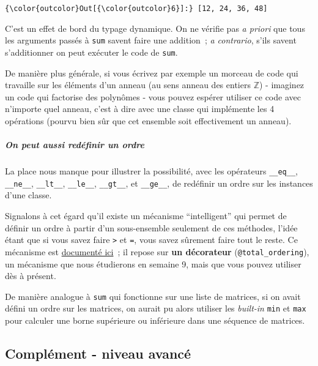 \begin{Verbatim}[commandchars=\\\{\}]
{\color{outcolor}Out[{\color{outcolor}6}]:} [12, 24, 36, 48]
\end{Verbatim}
            
    C'est un effet de bord du typage dynamique. On ne vérifie pas \emph{a
priori} que tous les arguments passés à \texttt{sum} savent faire une
addition~; \emph{a contrario}, s'ils savent s'additionner on peut
exécuter le code de \texttt{sum}.

De manière plus générale, si vous écrivez par exemple un morceau de code
qui travaille sur les éléments d'un anneau (au sens anneau des entiers
\(\mathbb{Z}\)) - imaginez un code qui factorise des polynômes - vous
pouvez espérer utiliser ce code avec n'importe quel anneau, c'est à dire
avec une classe qui implémente les 4 opérations (pourvu bien sûr que cet
ensemble soit effectivement un anneau).

    \hypertarget{on-peut-aussi-reduxe9finir-un-ordre}{%
\subparagraph{On peut aussi redéfinir un
ordre}\label{on-peut-aussi-reduxe9finir-un-ordre}}

    La place nous manque pour illustrer la possibilité, avec les opérateurs
\texttt{\_\_eq\_\_}, \texttt{\_\_ne\_\_}, \texttt{\_\_lt\_\_},
\texttt{\_\_le\_\_}, \texttt{\_\_gt\_\_}, et \texttt{\_\_ge\_\_}, de
redéfinir un ordre sur les instances d'une classe.

Signalons à cet égard qu'il existe un mécanisme ``intelligent'' qui
permet de définir un ordre à partir d'un sous-ensemble seulement de ces
méthodes, l'idée étant que si vous savez faire \texttt{\textgreater{}}
et \texttt{=}, vous savez sûrement faire tout le reste. Ce mécanisme est
\href{https://docs.python.org/3/library/functools.html\#functools.total_ordering}{documenté
ici}~; il repose sur \textbf{un décorateur} (\texttt{@total\_ordering}),
un mécanisme que nous étudierons en semaine 9, mais que vous pouvez
utiliser dès à présent.

    De manière analogue à \texttt{sum} qui fonctionne sur une liste de
matrices, si on avait défini un ordre sur les matrices, on aurait pu
alors utiliser les \emph{built-in} \texttt{min} et \texttt{max} pour
calculer une borne supérieure ou inférieure dans une séquence de
matrices.

    \hypertarget{compluxe9ment---niveau-avancuxe9}{%
\subsection{Complément - niveau
avancé}\label{compluxe9ment---niveau-avancuxe9}}

